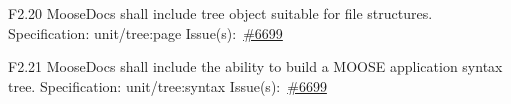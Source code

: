 \begin{Requirement}{F2.20}
MooseDocs shall include tree object suitable for file structures.
\newline
Specification: unit/tree:page
\newline
Issue(s):~\href{https://github.com/idaholab/moose/issues/6699}{\#6699}
\end{Requirement}

\begin{Requirement}{F2.21}
MooseDocs shall include the ability to build a MOOSE application syntax tree.
\newline
Specification: unit/tree:syntax
\newline
Issue(s):~\href{https://github.com/idaholab/moose/issues/6699}{\#6699}
\end{Requirement}
